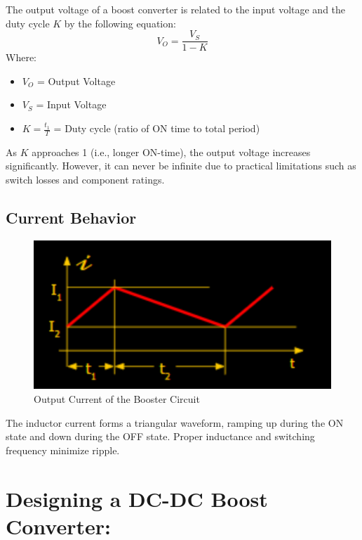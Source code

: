 \documentclass[12pt]{article}
\begin{document}
The output voltage of a boost converter is related to the input voltage and the duty cycle \( K \) by
the following equation:
\[
    V_O = \frac{V_S}{1 - K}
\]
Where:
\begin{itemize}
    \item \( V_O \) = Output Voltage
    \item \( V_S \) = Input Voltage
    \item \( K = \frac{t_1}{T} \) = Duty cycle (ratio of ON time to total period)
\end{itemize}
As \( K \) approaches 1 (i.e., longer ON-time), the output voltage increases significantly. However, it
can never be infinite due to practical limitations such as switch losses and component ratings.\cite{lm2577t-adj}

\subsection*{Current Behavior}
\begin{figure}[H]
    \centering
    \includegraphics[width=.5\textwidth]{ch2.png}
    \caption{Output Current of the Booster Circuit}
\end{figure}
The inductor current forms a triangular waveform, ramping up during the ON state and down during the OFF state. Proper inductance and switching frequency minimize ripple.\cite{lm2577t-adj}

\section*{Designing a DC-DC Boost Converter:}
\end{document}
